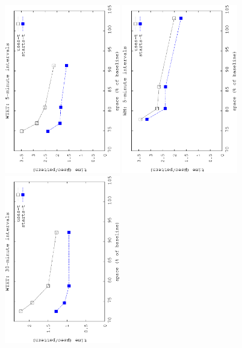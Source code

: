\begin{figure}[!ht]
	\begin{center}
		\begin{center}
			{\includegraphics[angle=-90,width=0.45\textwidth]{figures_synt/madrid_t5mht.eps}}
			{\includegraphics[angle=-90,width=0.45\textwidth]{figures_synt/madrid_t5mwm.eps}}
			{\includegraphics[angle=-90,width=0.45\textwidth]{figures_synt/madrid_t30mht.eps}}

\end{center}
\end{center}
\end{figure}
